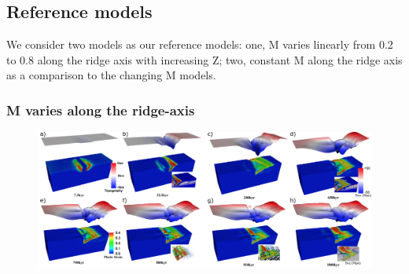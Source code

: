 \subsection{Reference models}
We consider two models as our reference models: one, M varies linearly from 0.2 to 0.8 along the ridge axis with increasing Z; two, constant M along the ridge axis as a comparison to the changing M models.

\subsubsection{M varies along the ridge-axis}

\begin{figure}[hc]
  \centering
    \includegraphics[width=1.0\textwidth]{fig_Results1_1.png}

\end{figure}
